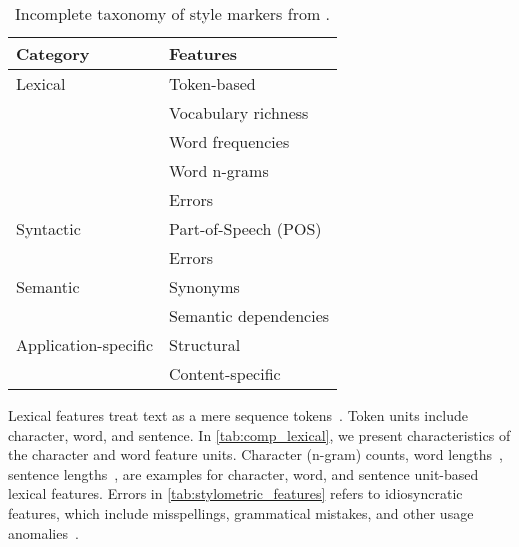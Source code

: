 \begin{table}[]
    \centering
    \caption{Incomplete taxonomy of style markers from \citep{stamatatos_survey_2009}.}
    \label{tab:stylometric_features}
 
    \begin{tabular}{@{}ll@{}} %
    \toprule
    \textbf{Category} & \textbf{Features} \\ 
    \midrule
    Lexical & Token-based \\ %
     & Vocabulary richness  \\
     & Word frequencies  \\
     & Word n-grams  \\
     & Errors \\
    Syntactic & Part-of-Speech (POS)  \\
     & Errors  \\
    Semantic & Synonyms \\
     & Semantic dependencies \\
    Application-specific & Structural  \\
     & Content-specific\\
     \bottomrule
    \end{tabular}%

\end{table}

Lexical features treat text as a mere sequence tokens~\citep{stamatatos_survey_2009}.
Token units include character, word, and sentence.
In \autoref{tab:comp_lexical}, we present characteristics of the character and word feature units.
Character (n-gram) counts, word lengths~\citep{stein_intrinsic_2011}, sentence lengths~\citep{stein_intrinsic_2011,abbasi_writeprints_2008}, are examples for character, word, and sentence unit-based lexical features.
Errors in \autoref{tab:stylometric_features} refers to idiosyncratic features, which include misspellings, grammatical mistakes, and other usage anomalies~\citep{abbasi_writeprints_2008,neal_surveying_2018}.


